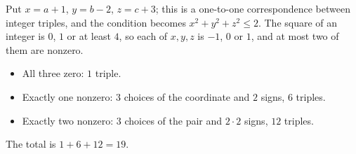 Put $x=a+1$, $y=b-2$, $z=c+3$; this is a one-to-one correspondence between integer triples, and the condition becomes $x^2+y^2+z^2\le2$. The square of an integer is $0$, $1$ or at least $4$, so each of $x,y,z$ is $-1$, $0$ or $1$, and at most two of them are nonzero.
\begin{itemize}
\item All three zero: $1$ triple.
\item Exactly one nonzero: $3$ choices of the coordinate and $2$ signs, $6$ triples.
\item Exactly two nonzero: $3$ choices of the pair and $2\cdot2$ signs, $12$ triples.
\end{itemize}
The total is $1+6+12=\boxed{19}$.
